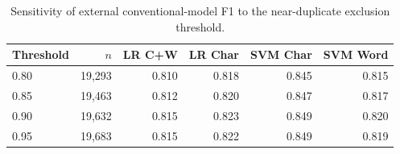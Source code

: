 \begin{table}[t]
\centering
\caption{Sensitivity of external conventional-model F1 to the near-duplicate exclusion threshold.}
\label{tab:threshold_sensitivity}
\small
\begin{tabular}{lrrrrr}
\toprule
Threshold & $n$ & LR C+W & LR Char & SVM Char & SVM Word \\
\midrule
0.80 & 19,293 & 0.810 & 0.818 & 0.845 & 0.815 \\
0.85 & 19,463 & 0.812 & 0.820 & 0.847 & 0.817 \\
0.90 & 19,632 & 0.815 & 0.823 & 0.849 & 0.820 \\
0.95 & 19,683 & 0.815 & 0.822 & 0.849 & 0.819 \\
\bottomrule
\end{tabular}
\end{table}
